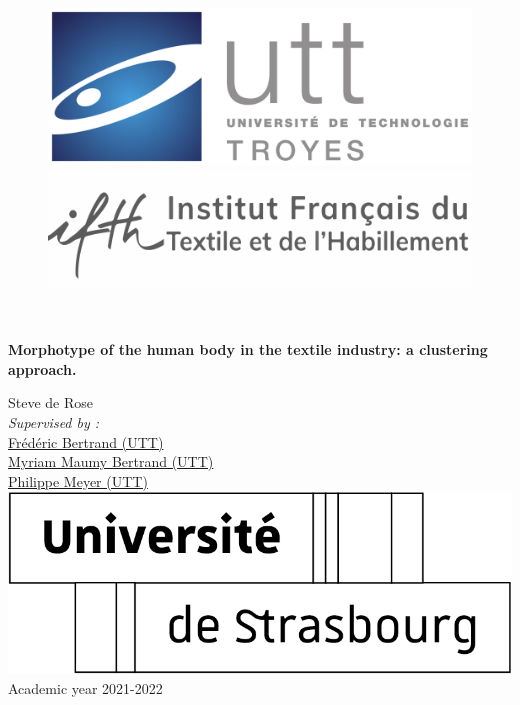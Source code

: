 \documentclass[12pt,a4paper,openany,UKenglish]{scrreprt}
\begin{document}
\begin{titlepage}
	\centering
	\begin{figure}
		\begin{minipage}{0.5\textwidth}
			\begin{flushleft}
				\includegraphics[width=.7\linewidth]{../Images/Logo_UTT.png}
			\end{flushleft}
		\end{minipage}\hfill
		\begin{minipage}{0.5\textwidth}
			\begin{flushright}
				\includegraphics[width=.7\linewidth]{../Images/ifth_retina.png}
			\end{flushright}
		\end{minipage}
	\end{figure}
	\phantom{test}\\
	\par\vspace{4cm}
	{\Large\bfseries Morphotype of the human body in the textile industry: a clustering approach.\par}
	\vspace{4cm}
	Steve de Rose\\
	\vspace{4cm}
	\textit{Supervised by :}\\
	\small\href{mailto:frederic.bertrand@utt.fr}{Frédéric Bertrand (UTT)}\\
	\small\href{mailto:myriam.maumy@utt.fr}{Myriam Maumy Bertrand (UTT)}\\
	\small\href{mailto:philippe.meyer@utt.fr}{Philippe Meyer (UTT)}\\
	\vfill
	\includegraphics[scale=0.1]{../Images/Logo_Unistra.png}\phantom{AAAAAAAAAAAAAAAAAAAAAAAA}\footnotesize Academic year 2021-2022
\end{titlepage}
\end{document}

